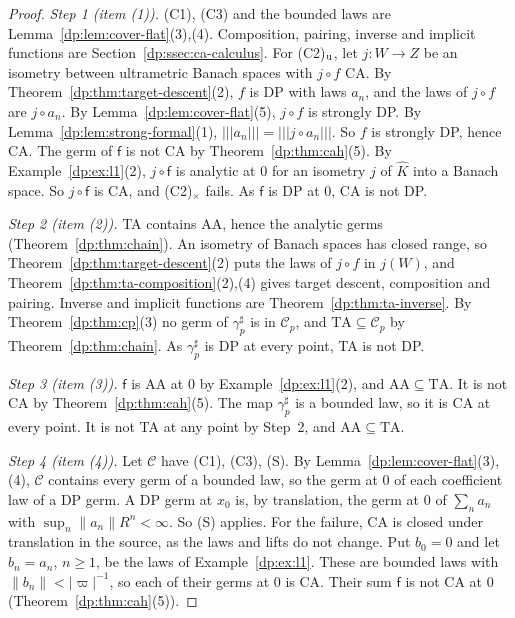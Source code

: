 \documentclass[11pt]{amsart}
\theoremstyle{definition}
\theoremstyle{remark}
\numberwithin{equation}{section}
\newcommand{\abs}[1]{\lvert #1\rvert}
\newcommand{\norm}[1]{\lVert #1\rVert}
\newcommand{\cC}{\mathcal{C}}
\newcommand{\Kh}{\widehat K}
\theoremstyle{plain}
\theoremstyle{definition}
\theoremstyle{plain}
\begin{document}
\begin{proof}
\emph{Step 1 (item (1)).} (C1), (C3) and the bounded laws are Lemma~\ref{dp:lem:cover-flat}(3),(4). Composition, pairing, inverse and implicit functions are Section~\ref{dp:ssec:ca-calculus}. For (C2)$_{\rm u}$, let $j\colon W\to Z$ be an isometry between ultrametric Banach spaces with $j\circ f$ CA. By Theorem~\ref{dp:thm:target-descent}(2), $f$ is DP with laws $a_n$, and the laws of $j\circ f$ are $j\circ a_n$. By Lemma~\ref{dp:lem:cover-flat}(5), $j\circ f$ is strongly DP. By Lemma~\ref{dp:lem:strong-formal}(1), $\lvert\!\lvert\!\lvert a_n\rvert\!\rvert\!\rvert=\lvert\!\lvert\!\lvert j\circ a_n\rvert\!\rvert\!\rvert$. So $f$ is strongly DP, hence CA. The germ of $\mathsf f$ is not CA by Theorem~\ref{dp:thm:cah}(5). By Example~\ref{dp:ex:l1}(2), $j\circ\mathsf f$ is analytic at $0$ for an isometry $j$ of $\Kh$ into a Banach space. So $j\circ\mathsf f$ is CA, and (C2)$_\times$ fails. As $\mathsf f$ is DP at $0$, CA is not DP.

\emph{Step 2 (item (2)).} TA contains AA, hence the analytic germs (Theorem~\ref{dp:thm:chain}). An isometry of Banach spaces has closed range, so Theorem~\ref{dp:thm:target-descent}(2) puts the laws of $j\circ f$ in $j(W)$, and Theorem~\ref{dp:thm:ta-composition}(2),(4) gives target descent, composition and pairing. Inverse and implicit functions are Theorem~\ref{dp:thm:ta-inverse}. By Theorem~\ref{dp:thm:cp}(3) no germ of $\gamma^\sharp_p$ is in $\cC_p$, and $\mathrm{TA}\subseteq\cC_p$ by Theorem~\ref{dp:thm:chain}. As $\gamma^\sharp_p$ is DP at every point, TA is not DP.

\emph{Step 3 (item (3)).} $\mathsf f$ is AA at $0$ by Example~\ref{dp:ex:l1}(2), and $\mathrm{AA}\subseteq\mathrm{TA}$. It is not CA by Theorem~\ref{dp:thm:cah}(5). The map $\gamma^\sharp_p$ is a bounded law, so it is CA at every point. It is not TA at any point by Step~2, and $\mathrm{AA}\subseteq\mathrm{TA}$.

\emph{Step 4 (item (4)).} Let $\cC$ have (C1), (C3), (S). By Lemma~\ref{dp:lem:cover-flat}(3),(4), $\cC$ contains every germ of a bounded law, so the germ at $0$ of each coefficient law of a DP germ. A DP germ at $x_0$ is, by translation, the germ at $0$ of $\sum_na_n$ with $\sup_n\norm{a_n}R^n<\infty$. So (S) applies. For the failure, CA is closed under translation in the source, as the laws and lifts do not change. Put $b_0=0$ and let $b_n=a_n$, $n\ge1$, be the laws of Example~\ref{dp:ex:l1}. These are bounded laws with $\norm{b_n}<\abs\varpi^{-1}$, so each of their germs at $0$ is CA. Their sum $\mathsf f$ is not CA at $0$ (Theorem~\ref{dp:thm:cah}(5)).
\end{proof}
\end{document}
